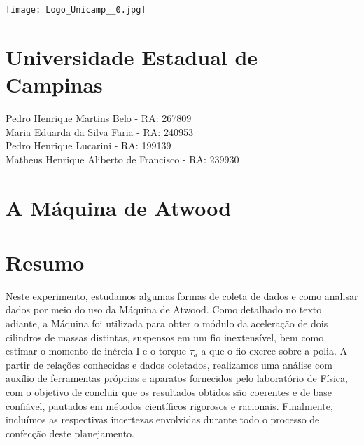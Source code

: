 \documentclass[a4papper, 10pt]{article}
\begin{document}
\begin{center}
\texttt{[image: Logo\_Unicamp\_\_0.jpg]}
\section*{Universidade Estadual de Campinas}
\vspace{2cm}
Pedro Henrique Martins Belo - RA: 267809\\
Maria Eduarda da Silva Faria - RA: 240953\\
Pedro Henrique Lucarini - RA: 199139\\
Matheus Henrique Aliberto de Francisco - RA: 239930\\
\vspace{8cm}
\section*{A Máquina de Atwood}
\end{center}
\newpage
\section{Resumo}
\vspace{0.10cm}
\indent Neste experimento, estudamos algumas formas de coleta de dados e como  analisar dados por meio do uso da Máquina de Atwood. Como detalhado no texto adiante, a Máquina foi utilizada para obter o módulo da aceleração de dois cilindros de massas distintas, suspensos em um fio inextensível, bem como estimar o momento de inércia I e o torque {\large $\tau_a$} a que o fio exerce sobre a polia. A partir de relações conhecidas e dados coletados, realizamos uma análise com auxílio de ferramentas próprias e aparatos fornecidos pelo laboratório de Física, com o objetivo de concluir que os resultados obtidos são coerentes e de base confiável, pautados em métodos científicos rigorosos e racionais. Finalmente, incluímos as respectivas incertezas envolvidas durante todo o processo de confecção deste planejamento. 
\vspace{0.10cm}
\end{document}
